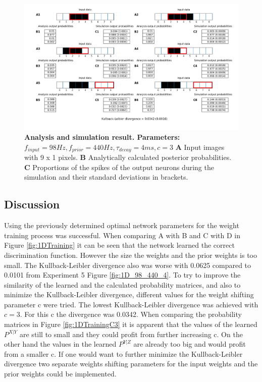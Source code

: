 \begin{figure}
  \includegraphics[width=\linewidth]{figures/1D/training/trainingEvaluation_98_440_4_c3.png}
  \caption{\textbf{Analysis and simulation result. Parameters: } $f_{input} = 98 Hz, f_{prior} = 440 Hz, \tau_{decay} = 4 ms, c = 3$ \textbf{A} Input images with 9 x 1 pixels. \textbf{B} Analytically calculated posterior probabilities. \textbf{C} Proportions of the spikes of the output neurons during the simulation and their standard deviations in brackets.}
  \label{fig:1DTrainingEvaluationC3}
\end{figure}

\subsection{Discussion}

Using the previously determined optimal network parameters for the weight training process was successful. When comparing A with B and C with D in Figure \ref{fig:1DTraining} it can be seen that the network learned the correct discrimination function. However the size the weights and the prior weights is too small. The Kullback-Leibler divergence also was worse with 0.0625 compared to 0.0101 from Experiment 5 Figure \ref{fig:1D_98_440_4}.
To try to improve the similarity of the learned and the calculated probability matrices, and also to minimize the Kullback-Leibler divergence, different values for the weight shifting parameter c were tried. The lowest Kullback-Leibler divergence was achieved with $c = 3$. For this c the divergence was 0.0342. When comparing  the probability matrices in Figure \ref{fig:1DTrainingC3} it is apparent that the values of the learned $P^{X|Y}$ are still to small and they could profit from further increasing c. On the other hand the values in the learned $P^{Y|Z}$ are already too big and would profit from a smaller c. If one would want to further minimize the Kullback-Leibler divergence two separate weights shifting parameters for the input weights and the prior weights could be implemented.